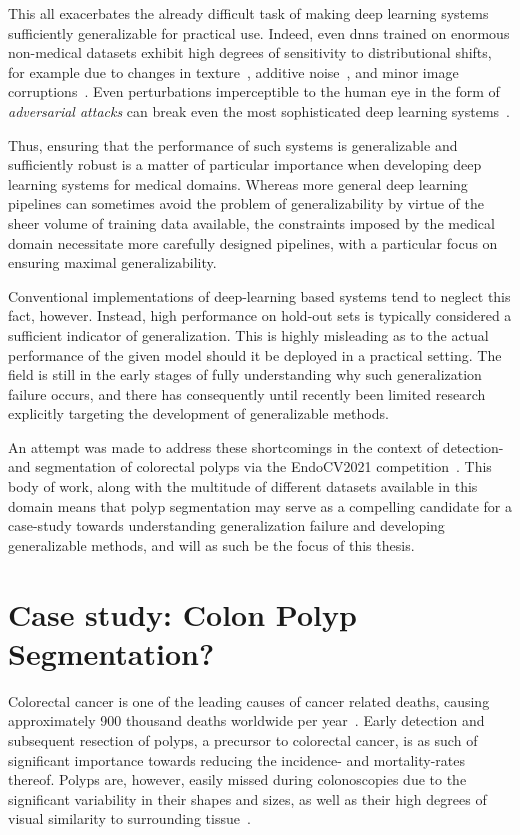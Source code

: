     This all exacerbates the already difficult task of making deep learning systems sufficiently generalizable for practical use. Indeed, even \glspl{dnn} trained on enormous non-medical datasets exhibit high degrees of sensitivity to distributional shifts, for example due to changes in texture~\cite{texturebias}, additive noise~\cite{noise_robustness}, and minor image corruptions~\cite{corruption_robustness}. Even perturbations imperceptible to the human eye in the form of \textit{adversarial attacks} can break even the most sophisticated deep learning systems~\cite{adversarial_attacks}.
    
    Thus, ensuring that the performance of such systems is generalizable and sufficiently robust is a matter of particular importance when developing deep learning systems for medical domains. Whereas more general deep learning pipelines can sometimes avoid the problem of generalizability by virtue of the sheer volume of training data available, the constraints imposed by the medical domain necessitate more carefully designed pipelines, with a particular focus on ensuring maximal generalizability. 
    
    Conventional implementations of deep-learning based systems tend to neglect this fact, however. Instead, high performance on hold-out sets is typically considered a sufficient indicator of generalization. This is highly misleading as to the actual performance of the given model should it be deployed in a practical setting. The field is still in the early stages of fully understanding why such generalization failure occurs, and there has consequently until recently been limited research explicitly targeting the development of generalizable methods. 
    
    An attempt was made to address these shortcomings in the context of detection- and segmentation of colorectal polyps via the EndoCV2021 competition~\cite{endocv2021}. This body of work, along with the multitude of different datasets available in this domain means that polyp segmentation may serve as a compelling candidate for a case-study towards understanding generalization failure and developing generalizable methods, and will as such be the focus of this thesis.   
    
    \section{Case study: Colon Polyp Segmentation?}   
    Colorectal cancer is one of the leading causes of cancer related deaths, causing approximately 900 thousand deaths worldwide per year~\cite{colorectal_cancer}. Early detection and subsequent resection of polyps, a precursor to colorectal cancer, is as such of significant importance towards reducing the incidence- and mortality-rates thereof. Polyps are, however, easily missed during colonoscopies due to the significant variability in their shapes and sizes, as well as their high degrees of visual similarity to surrounding tissue~\cite{missrate1, missrate2}. 
    
